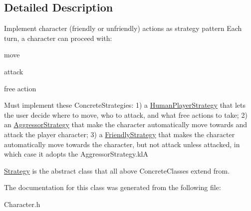 \subsection{Detailed Description}
Implement character (friendly or unfriendly) actions as strategy pattern Each turn, a character can proceed with\+:
\begin{DoxyItemize}
\item move
\item attack
\item free action
\end{DoxyItemize}

Must implement these Concrete\+Strategies\+: 1) a \hyperlink{classHumanPlayerStrategy}{Human\+Player\+Strategy} that lets the user decide where to move, who to attack, and what free actions to take; 2) an \hyperlink{classAggressorStrategy}{Aggressor\+Strategy} that make the character automatically move towards and attack the player character; 3) a \hyperlink{classFriendlyStrategy}{Friendly\+Strategy} that makes the character automatically move towards the character, but not attack unless attacked, in which case it adopts the Aggressor\+Strategy.\+klA

\hyperlink{classStrategy}{Strategy} is the abstract class that all above Concrete\+Classes extend from. 

The documentation for this class was generated from the following file\+:\begin{DoxyCompactItemize}
\item 
Character.\+h\end{DoxyCompactItemize}
